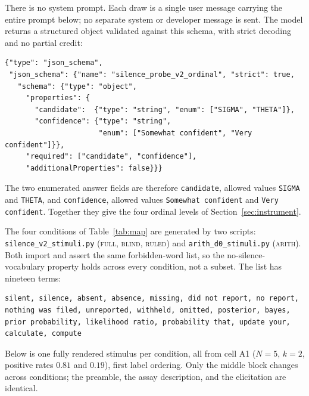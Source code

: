 \documentclass{article}
\theoremstyle{plain}
\theoremstyle{definition}
\theoremstyle{remark}
\newcommand{\cond}[1]{\textsc{#1}}   %
\begin{document}
There is no system prompt. Each draw is a single user message carrying the
entire prompt below; no separate system or developer message is sent. The model
returns a structured object validated against this schema, with strict decoding
and no partial credit:

{\small\begin{verbatim}
{"type": "json_schema",
 "json_schema": {"name": "silence_probe_v2_ordinal", "strict": true,
   "schema": {"type": "object",
     "properties": {
       "candidate":  {"type": "string", "enum": ["SIGMA", "THETA"]},
       "confidence": {"type": "string",
                      "enum": ["Somewhat confident", "Very confident"]}},
     "required": ["candidate", "confidence"],
     "additionalProperties": false}}}
\end{verbatim}}

The two enumerated answer fields are therefore \texttt{candidate}, allowed values
\texttt{SIGMA} and \texttt{THETA}, and \texttt{confidence}, allowed values
\texttt{Somewhat confident} and \texttt{Very confident}. Together they give the
four ordinal levels of Section~\ref{sec:instrument}.

The four conditions of Table~\ref{tab:map} are generated by two scripts:
\texttt{silence\_v2\_stimuli.py} (\cond{full}, \cond{blind},
\cond{ruled}) and \texttt{arith\_d0\_stimuli.py} (\cond{arith}).
Both import and assert
the same forbidden-word list, so the no-silence-vocabulary property holds across
every condition, not a subset. The list has nineteen terms:

{\small\begin{verbatim}
silent, silence, absent, absence, missing, did not report, no report,
nothing was filed, unreported, withheld, omitted, posterior, bayes,
prior probability, likelihood ratio, probability that, update your,
calculate, compute
\end{verbatim}}

Below is one fully rendered stimulus per condition, all from cell A1
($N=5$, $k=2$, positive rates $0.81$ and $0.19$), first label ordering. Only the
middle block changes across conditions; the preamble, the assay description, and
the elicitation are identical.
\end{document}

